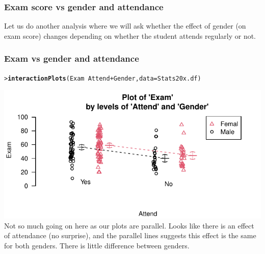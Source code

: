 \documentclass{beamer}\usepackage[]{graphicx}\usepackage[]{xcolor}
\makeatletter
\def\maxwidth{ %
  \ifdim\Gin@nat@width>\linewidth
    \linewidth
  \else
    \Gin@nat@width
  \fi
}
\newcommand{\hlopt}[1]{\textcolor[rgb]{0,0,0}{#1}}%
\newcommand{\hlstd}[1]{\textcolor[rgb]{0.345,0.345,0.345}{#1}}%
\newcommand{\hlkwc}[1]{\textcolor[rgb]{0.333,0.667,0.333}{#1}}%
\newcommand{\hlkwd}[1]{\textcolor[rgb]{0.737,0.353,0.396}{\textbf{#1}}}%
\newenvironment{kframe}{%
 \def\at@end@of@kframe{}%
 \ifinner\ifhmode%
  \def\at@end@of@kframe{\end{minipage}}%
  \begin{minipage}{\columnwidth}%
 \fi\fi%
 \def\FrameCommand##1{\hskip\@totalleftmargin \hskip-\fboxsep
 \colorbox{shadecolor}{##1}\hskip-\fboxsep
     \hskip-\linewidth \hskip-\@totalleftmargin \hskip\columnwidth}%
 \MakeFramed {\advance\hsize-\width
   \@totalleftmargin\z@ \linewidth\hsize
   \@setminipage}}%
 {\par\unskip\endMakeFramed%
 \at@end@of@kframe}
\newenvironment{knitrout}{}{} %
\makeatother
\begin{document}
\begin{frame}[fragile]
\frametitle{Exam score vs gender and attendance}

Let us do another analysis where we will ask whether the effect of gender (on exam score) changes depending on whether the student attends regularly or not.

\end{frame}


\begin{frame}[fragile]
\frametitle{Exam vs gender and attendance}

\begin{knitrout}\scriptsize
{}\color{fgcolor}\begin{kframe}
\begin{alltt}
\hlstd{> }\hlkwd{interactionPlots}\hlstd{(Exam} \hlopt{~} \hlstd{Attend} \hlopt{+} \hlstd{Gender,} \hlkwc{data} \hlstd{= Stats20x.df)}
\end{alltt}
\end{kframe}
\end{knitrout}

\begin{knitrout}\scriptsize
{}\color{fgcolor}
\includegraphics[width=\maxwidth]{figure/RC-H12-020-1} 
\end{knitrout}
Not so much going on here as our plots are parallel. Looks like there is an effect of attendance (no surprise), and the parallel lines suggests this effect is the same for both genders. There is little difference between genders.


\end{frame}
\end{document}
